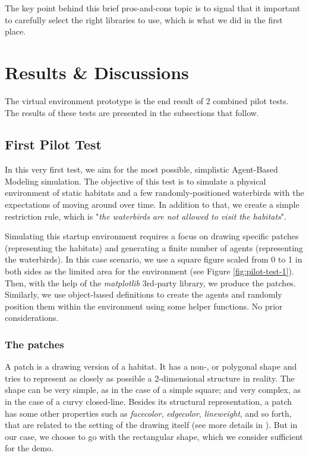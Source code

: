 \noindent
The key point behind this brief pros-and-cons topic is to signal that it important to carefully select the right libraries to use, which is what we did in the first place.

\section{Results \& Discussions}

The virtual environment prototype is the end result of 2 combined pilot tests. The results of these tests are presented in the subsections that follow.

\subsection{First Pilot Test}
In this very first test, we aim for the most possible, simplistic Agent-Based Modeling simulation. The objective of this test is to simulate a physical environment of static habitats and a few randomly-positioned waterbirds with the expectations of moving around over time. In addition to that, we create a simple restriction rule, which is "\textit{the waterbirds are not allowed to visit the habitats}".

Simulating this startup environment requires a focus on drawing specific patches (representing the habitats) and generating a finite number of agents (representing the waterbirds). In this case scenario, we use a square figure scaled from 0 to 1 in both sides as the limited area for the environment (see Figure \ref{fig:pilot-test-1}). Then, with the help of the \emph{matplotlib} 3rd-party library, we produce the patches. Similarly, we use object-based definitions to create the agents and randomly position them within the environment using some helper functions. No prior considerations.

\subsubsection{The patches}
A patch is a drawing version of a habitat. It has a non-, or polygonal shape and tries to represent as closely as possible a 2-dimensional structure in reality. The shape can be very simple, as in the case of a simple square; and very complex, as in the case of a curvy closed-line. Besides its structural representation, a patch has some other properties such as \emph{facecolor}, \emph{edgecolor}, \emph{lineweight}, and so forth, that are related to the setting of the drawing itself (see more details in \cite{matplotlib.patches}). But in our case, we choose to go with the rectangular shape, which we consider sufficient for the demo.

